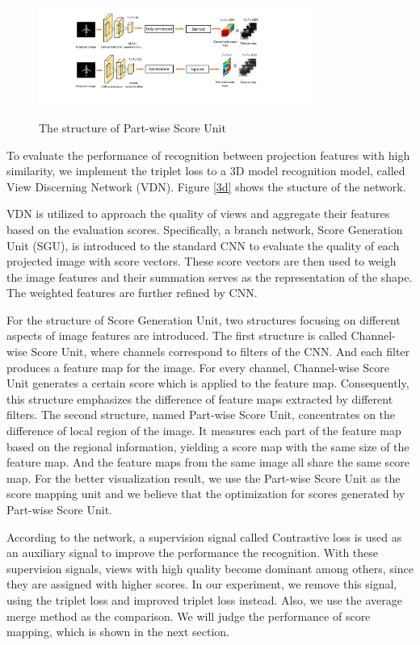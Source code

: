 \documentclass[11pt,onecolumn,letterpaper]{article}
\begin{document}
\begin{figure}[htbp]
\centering
\includegraphics[width = 0.8\textwidth]{scorePic.pdf}
\label{score}
\caption{The structure of Part-wise Score Unit}
\end{figure}
To evaluate the performance of recognition between projection features with high similarity, we implement the triplet loss to a 3D model recognition model, called View Discerning Network (VDN). Figure \ref{3d} shows the stucture of the network.

VDN is utilized to approach the quality of views and aggregate their features based on the evaluation scores. Specifically, a branch network, Score Generation Unit (SGU), is introduced to the standard CNN to evaluate the quality of each projected image with score vectors. These score vectors are then used to weigh the image features and their summation serves as the representation of the shape. The weighted features are further refined by CNN.

For the structure of Score Generation Unit, two structures focusing on different aspects of image features are introduced. The first structure is called Channel-wise Score Unit, where channels correspond to filters of the CNN. And each filter produces a feature map for the image. For every channel, Channel-wise Score Unit generates a certain score which is applied to the feature map. Consequently, this structure emphasizes the difference of feature maps extracted by different filters. The second structure, named Part-wise Score Unit, concentrates on the difference of local region of the image. It measures each part of the feature map based on the regional information, yielding a score map with the same size of the feature map. And the feature maps from the same image all share the same score map. For the better visualization result, we use the Part-wise Score Unit as the score mapping unit and we believe that the optimization for scores generated by Part-wise Score Unit.

According to the network, a supervision signal called Contrastive loss is used as an auxiliary signal to improve the performance the recognition. With these supervision signals, views with high quality become dominant among others, since they are assigned with higher scores. In our experiment, we remove this signal, using the triplet loss and improved triplet loss instead. Also, we use the average merge method as the comparison. We will judge the performance of score mapping, which is shown in the next section.
\end{document}
